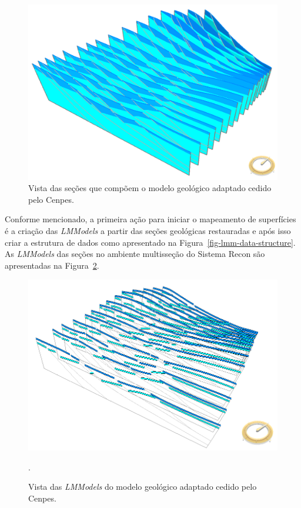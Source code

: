 \begin{figure} [H]
  \begin{center}
    \includegraphics[width=320pt]{images/fig-example-2-2}
    \caption{Vista das seções que compõem o modelo geológico adaptado cedido pelo Cenpes.}\label{fig-example-2-2}
  \end{center}
\end{figure}

Conforme mencionado, a primeira ação para iniciar o mapeamento de superfícies é a criação das \textit{LMModels} a partir das seções geológicas restauradas e após isso criar a estrutura de dados como apresentado na Figura~\ref{fig-lmm-data-structure}. As \textit{LMModels} das seções no ambiente multisseção do Sistema Recon são apresentadas na Figura~\ref{fig-example-2-3}.

\begin{figure} [H]
  \begin{center}
    \includegraphics[width=320pt]{images/fig-lmmodel-ms}
    \caption{Vista das \textit{LMModels} do modelo geológico adaptado cedido pelo Cenpes.}.\label{fig-example-2-3}
  \end{center}
\end{figure}

